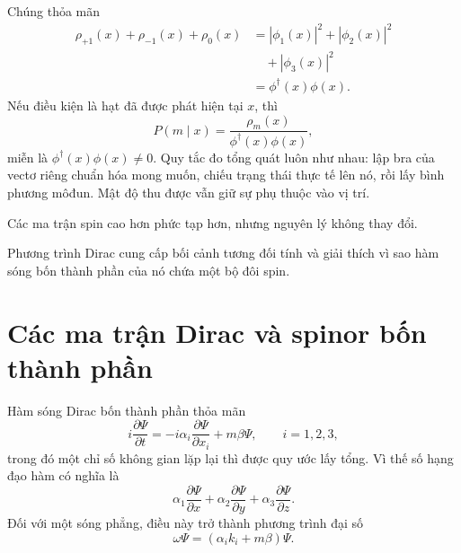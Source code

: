 Chúng thỏa mãn
\begin{equation}
\begin{aligned}
\rho_{+1}(x)+\rho_{-1}(x)+\rho_0(x)
&=
|\phi_1(x)|^2+|\phi_2(x)|^2
\\
&\quad{}+|\phi_3(x)|^2
\\
&=
\phi^\dagger(x)\phi(x).
\end{aligned}
\end{equation}
Nếu điều kiện là hạt đã được phát hiện tại \(x\), thì
\begin{equation}
P(m\mid x)
=
\frac{\rho_m(x)}{\phi^\dagger(x)\phi(x)},
\end{equation}
miễn là \(\phi^\dagger(x)\phi(x)\neq0\). Quy tắc đo tổng quát luôn như nhau: lập bra của vectơ riêng chuẩn hóa mong muốn, chiếu trạng thái thực tế lên nó, rồi lấy bình phương môđun. Mật độ thu được vẫn giữ sự phụ thuộc vào vị trí.

Các ma trận spin cao hơn phức tạp hơn, nhưng nguyên lý không thay đổi.

\begin{classroomqa}
\end{classroomqa}

\begin{classroomqa}
\end{classroomqa}

Phương trình Dirac cung cấp bối cảnh tương đối tính và giải thích vì sao hàm sóng bốn thành phần của nó chứa một bộ đôi spin.

\section{Các ma trận Dirac và spinor bốn thành phần}

Hàm sóng Dirac bốn thành phần thỏa mãn
\begin{equation}
i\frac{\partial\Psi}{\partial t}
=
-i\alpha_i\frac{\partial\Psi}{\partial x_i}
+m\beta\Psi,
\qquad i=1,2,3,
\end{equation}
trong đó một chỉ số không gian lặp lại thì được quy ước lấy tổng. Vì thế số hạng đạo hàm có nghĩa là
\begin{equation}
\alpha_1\frac{\partial\Psi}{\partial x}
+\alpha_2\frac{\partial\Psi}{\partial y}
+\alpha_3\frac{\partial\Psi}{\partial z}.
\end{equation}
Đối với một sóng phẳng, điều này trở thành phương trình đại số
\begin{equation}
\omega\Psi=(\alpha_i k_i+m\beta)\Psi.
\end{equation}

